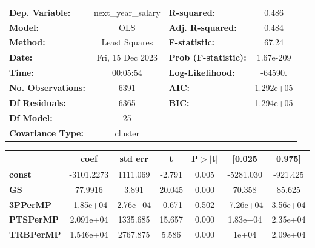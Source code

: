 \begin{center}
\begin{tabular}{lclc}
\toprule
\textbf{Dep. Variable:}             & next\_year\_salary & \textbf{  R-squared:         } &     0.486   \\
\textbf{Model:}                     &        OLS         & \textbf{  Adj. R-squared:    } &     0.484   \\
\textbf{Method:}                    &   Least Squares    & \textbf{  F-statistic:       } &     67.24   \\
\textbf{Date:}                      &  Fri, 15 Dec 2023  & \textbf{  Prob (F-statistic):} & 1.67e-209   \\
\textbf{Time:}                      &      00:05:54      & \textbf{  Log-Likelihood:    } &   -64590.   \\
\textbf{No. Observations:}          &         6391       & \textbf{  AIC:               } & 1.292e+05   \\
\textbf{Df Residuals:}              &         6365       & \textbf{  BIC:               } & 1.294e+05   \\
\textbf{Df Model:}                  &           25       & \textbf{                     } &             \\
\textbf{Covariance Type:}           &      cluster       & \textbf{                     } &             \\
\bottomrule
\end{tabular}
\begin{tabular}{lcccccc}
                                    & \textbf{coef} & \textbf{std err} & \textbf{t} & \textbf{P$> |$t$|$} & \textbf{[0.025} & \textbf{0.975]}  \\
\midrule
\textbf{const}                      &   -3101.2273  &     1111.069     &    -2.791  &         0.005        &    -5281.030    &     -921.425     \\
\textbf{GS}                         &      77.9916  &        3.891     &    20.045  &         0.000        &       70.358    &       85.625     \\
\textbf{3PPerMP}                    &    -1.85e+04  &     2.76e+04     &    -0.671  &         0.502        &    -7.26e+04    &     3.56e+04     \\
\textbf{PTSPerMP}                   &    2.091e+04  &     1335.685     &    15.657  &         0.000        &     1.83e+04    &     2.35e+04     \\
\textbf{TRBPerMP}                   &    1.546e+04  &     2767.875     &     5.586  &         0.000        &        1e+04    &     2.09e+04     \\

\end{tabular}
\end{center}
